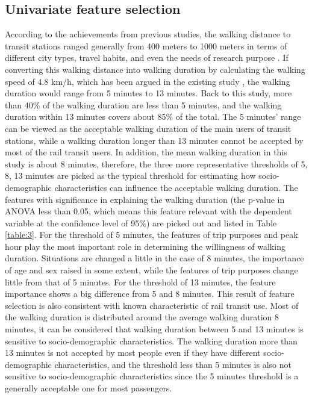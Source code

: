 \documentclass[Journal,letterpaper]{ascelike-new}
\begin{document}
\subsection{Univariate feature selection}
According to the achievements from previous studies, the walking distance to transit stations ranged generally from 400 meters to 1000 meters in terms of different city types, travel habits, and even the needs of research purpose \cite{Guerra2012,Murray1998,OSullivan1996,Keijer2000,Zhao2003,Alshalalfah2007}. If converting this walking distance into walking duration by calculating the walking speed of 4.8 km/h, which has been argued in the existing study \cite{Bohannon1997}, the walking duration would range from 5 minutes to 13 minutes. Back to this study, more than 40\% of the walking duration are less than 5 minutes, and the walking duration within 13 minutes covers about 85\% of the total. The 5 minutes’ range can be viewed as the acceptable walking duration of the main users of transit stations, while a walking duration longer than 13 minutes cannot be accepted by most of the rail transit users. In addition, the mean walking duration in this study is about 8 minutes, therefore, the three more representative thresholds of 5, 8, 13 minutes are picked as the typical threshold for estimating how socio-demographic characteristics can influence the acceptable walking duration. The features with significance in explaining the walking duration (the p-value in ANOVA less than 0.05, which means this feature relevant with the dependent variable at the confidence level of 95\%) are picked out and listed in Table \ref{table:3}.
%
For the threshold of 5 minutes, the features of trip purposes and peak hour play the most important role in determining the willingness of walking duration. Situations are changed a little in the case of 8 minutes, the importance of age and sex raised in some extent, while the features of trip purposes change little from that of 5 minutes. For the threshold of 13 minutes, the feature importance shows a big difference from 5 and 8 minutes. This result of feature selection is also consistent with known characteristic of rail transit use. Most of the walking duration is distributed around the average walking duration 8 minutes, it can be considered that walking duration between 5 and 13 minutes is sensitive to socio-demographic characteristics. The walking duration more than 13 minutes is not accepted by most people even if they have different socio-demographic characteristics, and the threshold less than 5 minutes is also not sensitive to socio-demographic characteristics since the 5 minutes threshold is a generally acceptable one for most passengers.
%
\end{document}
